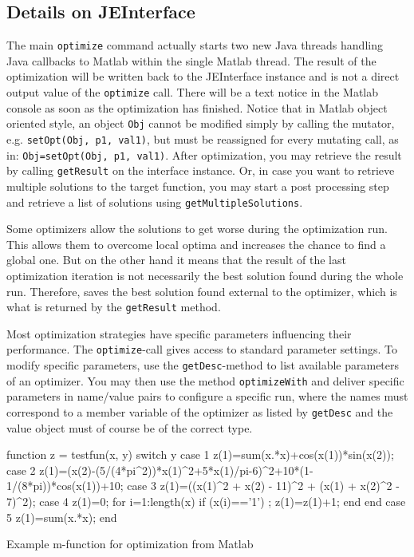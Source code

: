 \subsection{Details on JEInterface}

The main \texttt{optimize} command actually starts two new Java threads
handling Java callbacks to Matlab within the single Matlab thread.
The result of the optimization will be written back to the JEInterface
instance and is not a direct output value of the \texttt{optimize}
call. There will be a text notice in the Matlab console as soon as
the optimization has finished. Notice that in Matlab object oriented
style, an object \texttt{Obj} cannot be modified simply by calling
the mutator, e.g. \texttt{setOpt(Obj, p1, val1)}, but must be reassigned
for every mutating call, as in: \texttt{Obj=setOpt(Obj, p1, val1)}.
After optimization, you may retrieve the result by calling \texttt{getResult}
on the interface instance. Or, in case you want to retrieve multiple
solutions to the target function, you may start a post processing
step and retrieve a list of solutions using \texttt{getMultipleSolutions}.

Some optimizers allow the solutions to get worse during the optimization
run. This allows them to overcome local optima and increases the chance
to find a global one. But on the other hand it means that the result
of the last optimization iteration is not necessarily the best solution
found during the whole run. Therefore,  saves the best
solution found external to the optimizer, which is what is returned
by the \texttt{getResult} method. 

Most optimization strategies have specific parameters influencing
their performance. The \texttt{optimize}-call gives access to standard
parameter settings. To modify specific parameters, use the \texttt{getDesc}-method
to list available parameters of an optimizer. You may then use the
method \texttt{optimizeWith} and deliver specific parameters in name/value
pairs to configure a specific run, where the names must correspond
to a member variable of the optimizer as listed by \texttt{getDesc}
and the value object must of course be of the correct type.

\begin{algorithm}
\begin{mylstenv}
function z = testfun(x, y) 
	switch y     
	case 1 %
		z(1)=sum(x.*x)+cos(x(1))*sin(x(2));     
	case 2 %
		z(1)=(x(2)-(5/(4*pi^2))*x(1)^2+5*x(1)/pi-6)^2+10*(1-1/(8*pi))*cos(x(1))+10;     
	case 3 %
		z(1)=((x(1)^2 + x(2) - 11)^2 + (x(1) + x(2)^2 - 7)^2);     
	case 4 %
		z(1)=0;
		for i=1:length(x)          
			if (x(i)=='1') ; z(1)=z(1)+1; end         
		end     
	case 5 %
		z(1)=sum(x.*x);
end
\end{mylstenv}
	\caption{Example m-function for optimization from Matlab\label{alg:Example-m-function}}
\end{algorithm}


